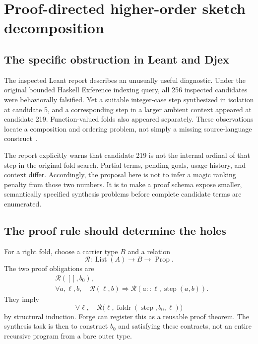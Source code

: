 \section{Proof-directed higher-order sketch decomposition}
\label{sec:sketches}

\subsection{The specific obstruction in Leant and Djex}
The inspected Leant report describes an unusually useful diagnostic. Under the
original bounded Haskell Exference indexing query, all 256 inspected candidates
were behaviorally falsified. Yet a suitable integer-case step synthesized in
isolation at candidate 5, and a corresponding step in a larger ambient context
appeared at candidate 219. Function-valued folds also appeared separately.
These observations locate a composition and ordering problem, not simply a
missing source-language construct~\cite{leant-indexing}.

The report explicitly warns that candidate 219 is not the internal ordinal of
that step in the original fold search. Partial terms, pending goals, usage
history, and context differ. Accordingly, the proposal here is not to infer a
magic ranking penalty from those two numbers. It is to make a proof schema
expose smaller, semantically specified synthesis problems before complete
candidate terms are enumerated.

\subsection{The proof rule should determine the holes}
For a right fold, choose a carrier type $B$ and a relation
\[
 \mathcal R:\operatorname{List}(A)\to B\to\operatorname{Prop}.
\]
The two proof obligations are
\begin{align}
 &\mathcal R([],b_0),\label{eq:fold-base}\\
 &\forall a,\ell,b,\quad
   \mathcal R(\ell,b)\Longrightarrow
   \mathcal R(a::\ell,\operatorname{step}(a,b)).\label{eq:fold-step}
\end{align}
They imply
\begin{equation}
\label{eq:fold-rule}
 \forall\ell,\quad
 \mathcal R\bigl(\ell,\operatorname{foldr}(\operatorname{step},b_0,\ell)\bigr)
\end{equation}
by structural induction. Forge can register this as a reusable proof theorem.
The synthesis task is then to construct $b_0$ and  satisfying these
contracts, not an entire recursive program from a bare outer type.

